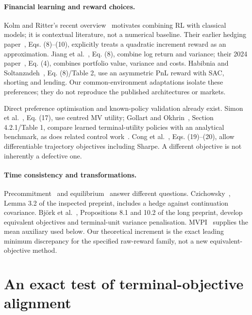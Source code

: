 \documentclass[sigconf,anonymous,review]{acmart}
\begin{document}
\paragraph{Financial learning and reward choices.}
Kolm and Ritter's recent overview~\cite{kolm2025} motivates combining RL with classical models; it is contextual literature, not a numerical baseline. Their earlier hedging paper~\cite{kolm2019}, Eqs. (8)--(10), explicitly treats a quadratic increment reward as an approximation. Jiang et al.~\cite{jiang2025}, Eq. (8), combine log return and variance; their 2024 paper~\cite{jiang2024}, Eq. (4), combines portfolio value, variance and costs. Habibnia and Soltanzadeh~\cite{habibnia2024}, Eq. (8)/Table 2, use an asymmetric PnL reward with SAC, shorting and lending. Our common-environment adaptations isolate these preferences; they do not reproduce the published architectures or markets.

Direct preference optimisation and known-policy validation already exist. Simon et al.~\cite{simon2026}, Eq. (17), use centred MV utility; Gollart and Okhrin~\cite{gollart2025}, Section 4.2.1/Table 1, compare learned terminal-utility policies with an analytical benchmark, as does related control work~\cite{chaouki2020}. Cong et al.~\cite{cong2026}, Eqs. (19)--(20), allow differentiable trajectory objectives including Sharpe. A different objective is not inherently a defective one.

\paragraph{Time consistency and transformations.}
Precommitment~\cite{ling2000} and equilibrium~\cite{basak2010,dai2023} answer different questions. Czichowsky~\cite{czichowsky2013}, Lemma 3.2 of the inspected preprint, includes a hedge against continuation covariance. Bj\"ork et al.~\cite{bkm2016}, Propositions 8.1 and 10.2 of the long preprint, develop equivalent objectives and terminal-unit variance penalisation. MVPI~\cite{zhang2021} supplies the mean auxiliary used below. Our theoretical increment is the exact leading minimum discrepancy for the specified raw-reward family, not a new equivalent-objective method.

\section{An exact test of terminal-objective alignment}
\end{document}

